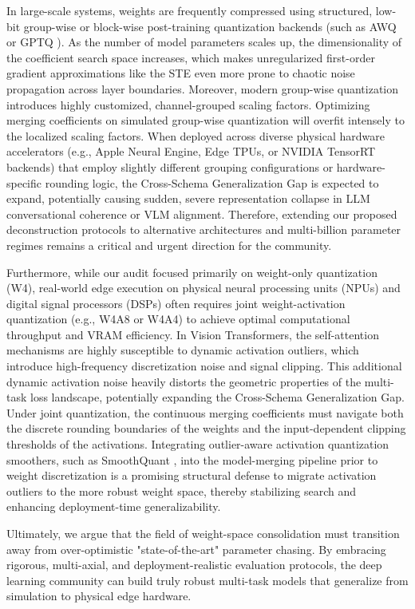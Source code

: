 In large-scale systems, weights are frequently compressed using structured, low-bit group-wise or block-wise post-training quantization backends (such as AWQ \cite{lin2023awq} or GPTQ \cite{frantar2022gptq}). As the number of model parameters scales up, the dimensionality of the coefficient search space increases, which makes unregularized first-order gradient approximations like the STE even more prone to chaotic noise propagation across layer boundaries. Moreover, modern group-wise quantization introduces highly customized, channel-grouped scaling factors. Optimizing merging coefficients on simulated group-wise quantization will overfit intensely to the localized scaling factors. When deployed across diverse physical hardware accelerators (e.g., Apple Neural Engine, Edge TPUs, or NVIDIA TensorRT backends) that employ slightly different grouping configurations or hardware-specific rounding logic, the Cross-Schema Generalization Gap is expected to expand, potentially causing sudden, severe representation collapse in LLM conversational coherence or VLM alignment. Therefore, extending our proposed deconstruction protocols to alternative architectures and multi-billion parameter regimes remains a critical and urgent direction for the community.

Furthermore, while our audit focused primarily on weight-only quantization (W4), real-world edge execution on physical neural processing units (NPUs) and digital signal processors (DSPs) often requires joint weight-activation quantization (e.g., W4A8 or W4A4) to achieve optimal computational throughput and VRAM efficiency. In Vision Transformers, the self-attention mechanisms are highly susceptible to dynamic activation outliers, which introduce high-frequency discretization noise and signal clipping. This additional dynamic activation noise heavily distorts the geometric properties of the multi-task loss landscape, potentially expanding the Cross-Schema Generalization Gap. Under joint quantization, the continuous merging coefficients must navigate both the discrete rounding boundaries of the weights and the input-dependent clipping thresholds of the activations. Integrating outlier-aware activation quantization smoothers, such as SmoothQuant \cite{xiao2023smoothquant}, into the model-merging pipeline prior to weight discretization is a promising structural defense to migrate activation outliers to the more robust weight space, thereby stabilizing search and enhancing deployment-time generalizability.

Ultimately, we argue that the field of weight-space consolidation must transition away from over-optimistic "state-of-the-art" parameter chasing. By embracing rigorous, multi-axial, and deployment-realistic evaluation protocols, the deep learning community can build truly robust multi-task models that generalize from simulation to physical edge hardware.
